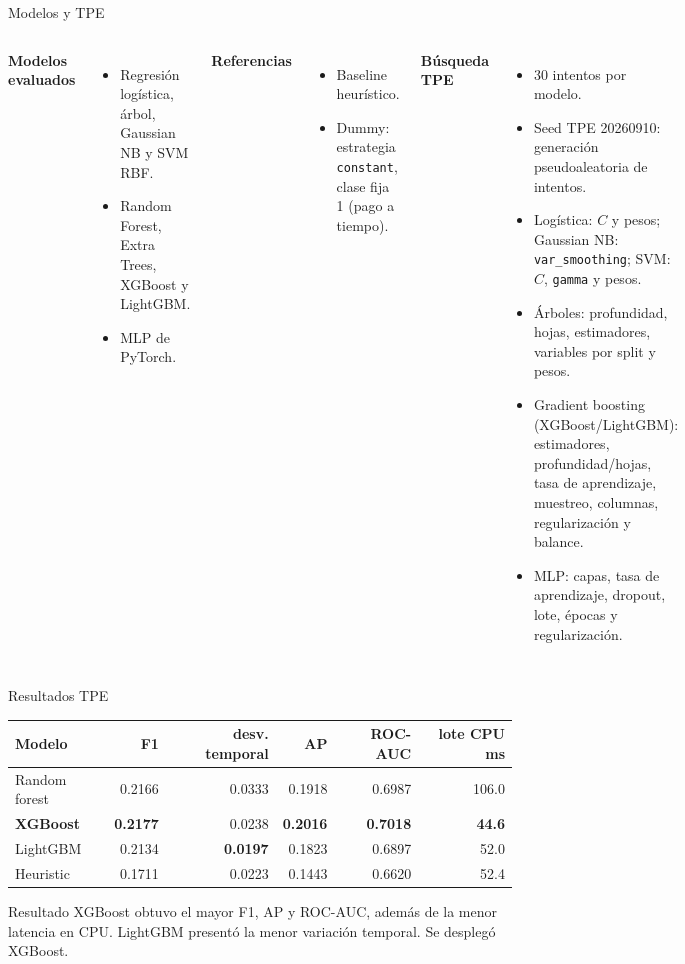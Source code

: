 \documentclass[aspectratio=169]{beamer}
\begin{document}
\begin{frame}{Modelos y TPE}
\begin{columns}[T]
\textbf{Modelos evaluados}
\begin{itemize}
  \item Regresión logística, árbol, Gaussian NB y SVM RBF.
  \item Random Forest, Extra Trees, XGBoost y LightGBM.
  \item MLP de PyTorch.
\end{itemize}
\textbf{Referencias}
\begin{itemize}
  \item Baseline heurístico.
  \item Dummy: estrategia \texttt{constant}, clase fija 1 (pago a tiempo).
\end{itemize}
\textbf{Búsqueda TPE}
\scriptsize
\begin{itemize}
  \item 30 intentos por modelo.
  \item Seed TPE 20260910: generación pseudoaleatoria de intentos.
  \item Logística: $C$ y pesos; Gaussian NB: \texttt{var\_smoothing}; SVM: $C$, \texttt{gamma} y pesos.
  \item Árboles: profundidad, hojas, estimadores, variables por split y pesos.
  \item Gradient boosting (XGBoost/LightGBM): estimadores, profundidad/hojas, tasa de aprendizaje, muestreo, columnas, regularización y balance.
  \item MLP: capas, tasa de aprendizaje, dropout, lote, épocas y regularización.
\end{itemize}
\end{columns}
\end{frame}

\begin{frame}{Resultados TPE}
\centering
\small
\begin{tabular}{lrrrrr}
\toprule
Modelo & F1 & desv. temporal & AP & ROC-AUC & lote CPU ms \\
\midrule
Random forest & 0.2166 & 0.0333 & 0.1918 & 0.6987 & 106.0 \\
\textbf{XGBoost} & \textbf{0.2177} & 0.0238 & \textbf{0.2016} & \textbf{0.7018} & \textbf{44.6} \\
LightGBM & 0.2134 & \textbf{0.0197} & 0.1823 & 0.6897 & 52.0 \\
Heuristic & 0.1711 & 0.0223 & 0.1443 & 0.6620 & 52.4 \\
\bottomrule
\end{tabular}
\vspace{0.35cm}
\begin{block}{Resultado}
XGBoost obtuvo el mayor F1, AP y ROC-AUC, además de la menor latencia en CPU. LightGBM presentó la menor variación temporal. Se desplegó XGBoost.
\end{block}
\end{frame}
\end{document}
